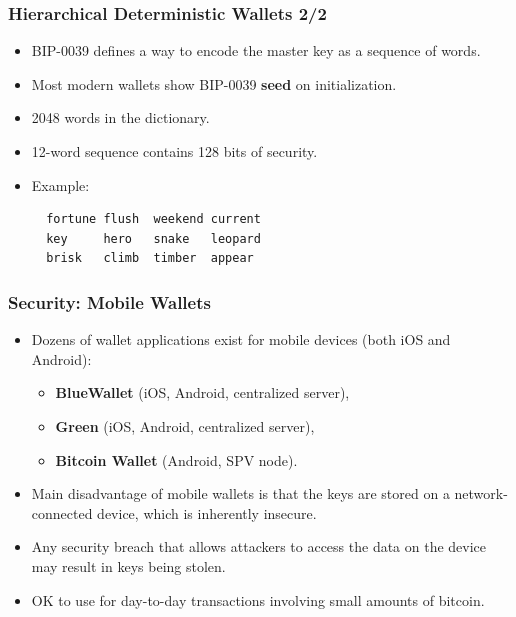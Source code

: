 \documentclass{beamer}
\begin{document}
\begin{frame}[fragile]
  \frametitle{Hierarchical Deterministic Wallets 2/2}
  \begin{itemize}
  \item BIP-0039 defines a way to encode the master key as a sequence of words.
  \item Most modern wallets show BIP-0039 \textbf{seed} on initialization.
  \item 2048 words in the dictionary.
  \item 12-word sequence contains 128 bits of security.
  \item Example:
\begin{verbatim}
  fortune flush  weekend current
  key     hero   snake   leopard
  brisk   climb  timber  appear
\end{verbatim}
  \end{itemize}
\end{frame}

\begin{frame}
  \frametitle{Security: Mobile Wallets}
  \begin{itemize}
  \item Dozens of wallet applications exist for mobile devices (both iOS and
    Android):
    \begin{itemize}
    \item \textbf{BlueWallet} (iOS, Android, centralized server),
    \item \textbf{Green} (iOS, Android, centralized server),
    \item \textbf{Bitcoin Wallet} (Android, SPV node).
    \end{itemize}
  \item Main disadvantage of mobile wallets is that the keys are stored on a
    network-connected device, which is inherently insecure.
  \item Any security breach that allows attackers to access the data on the
    device may result in keys being stolen.
  \item OK to use for day-to-day transactions involving small amounts of
    bitcoin.
  \end{itemize}
\end{frame}
\end{document}
